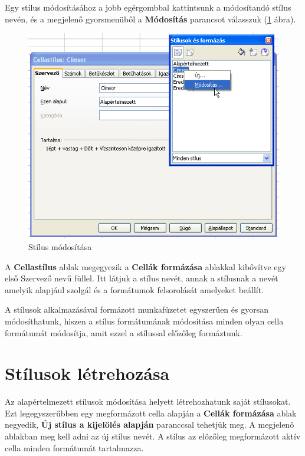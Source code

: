Egy stílus módosításához a jobb egérgombbal kattintsunk a
módosítandó stílus nevén, és a megjelenő
gyorsmenüből a \textbf{Módosítás} parancsot válasszuk
(\ref{StílusMódosítása} ábra).

\begin{figure}[!h]
\begin{center}
\includegraphics[width=14.208cm]{oocalcv1-img158.png}
\caption{Stílus módosítása}\label{StílusMódosítása}
\end{center}
\end{figure}

A \textbf{Cellastílus} ablak megegyezik a \textbf{Cellák
formázása} ablakkal kibővítve egy első Szervező
nevű füllel. Itt látjuk a stílus nevét, annak a stílusnak
a nevét amelyik alapjául szolgál és a formátumok
felsorolását amelyeket beállít.

A stílusok alkalmazásával formázott munkafüzetet
egyszerűen és gyorsan módosíthatunk, hiszen a stílus
formátumának módosítása minden olyan cella formátumát
módosítja, amit ezzel a stílussal előzőleg formáztunk.


\section{Stílusok létrehozása}

Az alapértelmezett stílusok módosítása helyett
létrehozhatunk saját stílusokat. Ezt legegyszerűbben egy
megformázott cella alapján a \textbf{Cellák formázása} ablak
negyedik, \textbf{Új stílus a kijelölés alapján} paranccsal
tehetjük meg. A megjelenő ablakban meg kell adni az új stílus
nevét. A stílus az előzőleg megformázott aktív cella
minden formátumát tartalmazza.

